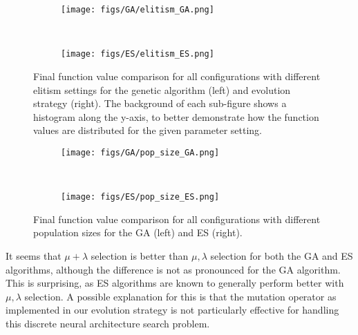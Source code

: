 \documentclass{article}
\begin{document}
\begin{figure*}[htbp]
    \centering
    \begin{subfigure}[b]{0.45\textwidth}
        \centering
        \texttt{[image: figs/GA/elitism\_GA.png]}
        \caption{}
        \label{fig:elitism_GA}
    \end{subfigure}
    ~
    \begin{subfigure}[b]{0.45\textwidth}
        \centering 
        \texttt{[image: figs/ES/elitism\_ES.png]}
        \caption{}
        \label{fig:elitism_ES}
    \end{subfigure}
    \captionsetup{width=.9\textwidth}
    \caption{
        Final function value comparison for all configurations with different elitism settings for the genetic algorithm (left) and evolution strategy (right).
        The background of each sub-figure shows a histogram along the y-axis, to better demonstrate how the function values are distributed for the given parameter setting.
    }
    \label{fig:elitism}
\end{figure*}

\begin{figure*}[htbp]
    \centering
    \begin{subfigure}[b]{0.45\textwidth}
        \centering
        \texttt{[image: figs/GA/pop\_size\_GA.png]}
        \caption{}
        \label{fig:pop_size_GA}
    \end{subfigure}
    ~
    \begin{subfigure}[b]{0.45\textwidth}
        \centering 
        \texttt{[image: figs/ES/pop\_size\_ES.png]}
        \caption{}
        \label{fig:pop_size_ES}
    \end{subfigure}
    \captionsetup{width=.9\textwidth}
    \caption{
        Final function value comparison for all configurations with different population sizes for the GA (left) and ES (right).
    }
    \label{fig:pop_size}
\end{figure*}

It seems that $\mu + \lambda$ selection is better than $\mu, \lambda$ selection for both the GA and ES algorithms, although the difference is not as pronounced for the GA algorithm.
This is surprising, as ES algorithms are known to generally perform better with $\mu, \lambda$ selection.
A possible explanation for this is that the mutation operator as implemented in our evolution strategy is not particularly effective for handling this discrete neural architecture search problem.
\end{document}
